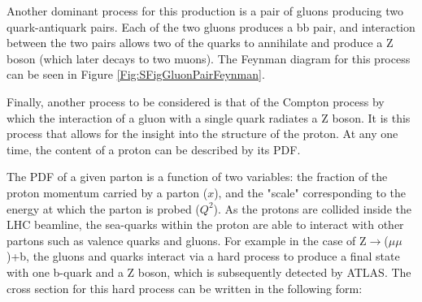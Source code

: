 \documentclass[12pt,a4paper,epsf,portrait,times,epsfig]{report}
\begin{document}

		
		
		Another dominant process for this production is a pair of gluons producing two quark-antiquark pairs. Each of the two gluons produces a bb pair, and interaction between the two pairs allows two of the quarks to annihilate and produce a Z boson (which later decays to two muons). The Feynman diagram for this process can be seen in Figure \ref{Fig:SFigGluonPairFeynman}. \par
		
		Finally, another process to be considered is that of the Compton process by which the interaction of a gluon with a single quark radiates a Z boson. It is this process that allows for the insight into the structure of the proton. At any one time, the content of a proton can be described by its PDF. \par
		
		The PDF of a given parton is a function of two variables: the fraction of the proton momentum carried by a parton ($x$), and the "scale" corresponding to the energy at which the parton is probed ($Q^{2}$). As the protons are collided inside the LHC beamline, the sea-quarks within the proton are able to interact with other partons such as valence quarks and gluons. For example in the case of Z$\rightarrow$($\mu\mu$)+b, the gluons and quarks interact via a hard process to produce a final state with one b-quark and a Z boson, which is subsequently detected by ATLAS. The cross section for this hard process can be written in the following form:
		

		
\end{document}
